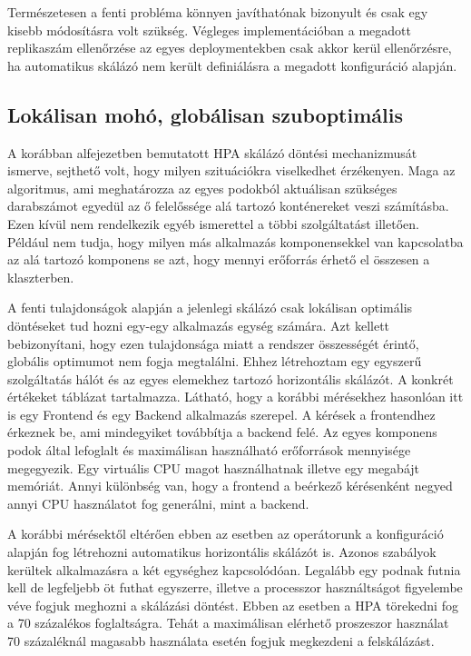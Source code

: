 Természetesen a fenti probléma könnyen javíthatónak bizonyult és csak egy kisebb módosításra volt szükség.
Végleges implementációban a megadott replikaszám ellenőrzése az egyes deploymentekben csak akkor kerül ellenőrzésre, ha automatikus skálázó nem került definiálásra a megadott konfiguráció alapján.

\subsection{Lokálisan mohó, globálisan szuboptimális}

A korábban  alfejezetben bemutatott HPA skálázó döntési mechanizmusát ismerve, sejthető volt, hogy milyen szituációkra viselkedhet érzékenyen.
Maga az algoritmus, ami meghatározza az egyes podokból aktuálisan szükséges darabszámot egyedül az ő felelőssége alá tartozó konténereket veszi számításba.
Ezen kívül nem rendelkezik egyéb ismerettel a többi szolgáltatást illetően.
Például nem tudja, hogy milyen más alkalmazás komponensekkel van kapcsolatba az alá tartozó komponens se azt, hogy mennyi erőforrás érhető el összesen a klaszterben.

A fenti tulajdonságok alapján a jelenlegi skálázó csak lokálisan optimális döntéseket tud hozni egy-egy alkalmazás egység számára.
Azt kellett bebizonyítani, hogy ezen tulajdonsága miatt a rendszer összességét érintő, globális optimumot nem fogja megtalálni.
Ehhez létrehoztam egy egyszerű szolgáltatás hálót és az egyes elemekhez tartozó horizontális skálázót. 
A konkrét értékeket  táblázat tartalmazza.
Látható, hogy a korábbi mérésekhez hasonlóan itt is egy Frontend és egy Backend alkalmazás szerepel. 
A kérések a frontendhez érkeznek be, ami mindegyiket továbbítja a backend felé. 
Az egyes komponens podok által lefoglalt és maximálisan használható erőforrások mennyisége megegyezik.
Egy virtuális CPU magot használhatnak illetve egy megabájt memóriát.
Annyi különbség van, hogy a frontend a beérkező kérésenként negyed annyi CPU használatot fog generálni, mint a backend.

A korábbi mérésektől eltérően ebben az esetben az operátorunk a konfiguráció alapján fog létrehozni automatikus horizontális skálázót is.
Azonos szabályok kerültek alkalmazásra a két egységhez kapcsolódóan.
Legalább egy podnak futnia kell de legfeljebb öt futhat egyszerre, illetve a processzor használtságot figyelembe véve fogjuk meghozni a skálázási döntést.
Ebben az esetben a HPA törekedni fog a 70 százalékos foglaltságra. 
Tehát a maximálisan elérhető proszeszor használat 70 százaléknál magasabb használata esetén fogjuk megkezdeni a felskálázást.

